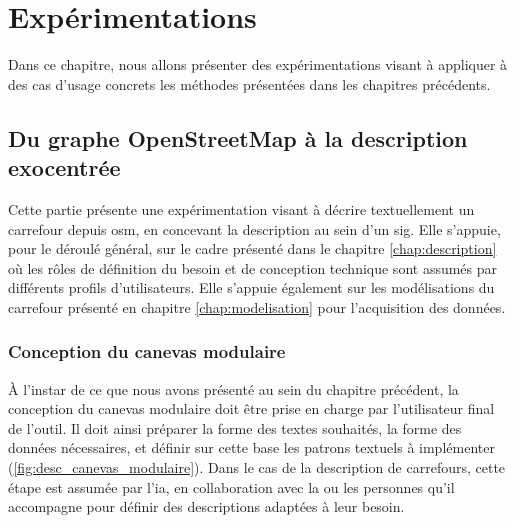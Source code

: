 \chapter{Expérimentations}
\label{chap:implementation}

Dans ce chapitre, nous allons présenter des expérimentations visant à appliquer à des cas d'usage concrets les méthodes présentées dans les chapitres précédents.






\section{Du graphe OpenStreetMap à la description exocentrée}

\label{sec:implementation_segmentation}

Cette partie présente une expérimentation visant à décrire textuellement un carrefour depuis \gls{osm}, en concevant la description au sein d'un \gls{sig}. Elle s'appuie, pour le déroulé général, sur le cadre présenté dans le chapitre \ref{chap:description} où les rôles de définition du besoin et de conception technique sont assumés par différents profils d'utilisateurs. Elle s'appuie également sur les modélisations du carrefour présenté en chapitre \ref{chap:modelisation} pour l'acquisition des données.

\subsection{Conception du canevas modulaire}

À l'instar de ce que nous avons présenté au sein du chapitre précédent, la conception du canevas modulaire doit être prise en charge par l'utilisateur final de l'outil. Il doit ainsi préparer la forme des textes souhaités, la forme des données nécessaires, et définir sur cette base les patrons textuels à implémenter (\ref{fig:desc_canevas_modulaire}). Dans le cas de la description de carrefours, cette étape est assumée par l'\gls{ia}, en collaboration avec la ou les personnes qu'il accompagne pour définir des descriptions adaptées à leur besoin.

